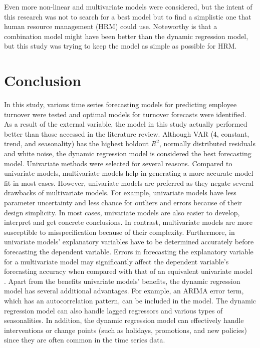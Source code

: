 Even more non-linear and multivariate models were considered, but the intent of this research was not to search for a best model but to find a simplistic one  that human resource management (HRM) could use. Noteworthy is that a combination model might have been better than the dynamic regression model, but this study was trying to keep the model  as simple as possible for HRM.
\section{Conclusion}
In this study, various time series forecasting models for predicting employee turnover were tested and optimal models for turnover forecasts were identified. As a result of the external variable, the model in this study actually performed better than those accessed in the literature review. Although VAR (4, constant, trend, and seasonality) has the highest holdout $R^2$, normally distributed residuals and white noise, the dynamic regression model is considered the best forecasting model. Univariate methods were selected for several reasons. Compared to univariate models, multivariate models help in generating a more accurate model fit in most cases. However, univariate models are preferred as they negate several drawbacks of multivariate models. For example, univariate models have less parameter uncertainty and less chance for outliers and errors because of their design simplicity. In most cases, univariate models are also easier to develop, interpret and get concrete conclusions. In contrast, multivariate models are more susceptible to misspecification because of their complexity. Furthermore, in univariate models' explanatory variables have to be determined accurately before forecasting the dependent variable. Errors in forecasting the explanatory variable for a multivariate model may significantly affect the dependent variable's forecasting accuracy when compared with that of an equivalent univariate model \citep{chatfield2000}. Apart from the benefits univariate models' benefits, the dynamic regression model has several additional advantages. For example, an ARIMA error term, which has an autocorrelation pattern, can be included in the model. The dynamic regression model can also handle lagged regressors and various types of seasonalities. In addition, the dynamic regression model can effectively handle interventions or change points (such as holidays, promotions, and new policies) since they are often common in the time series data.  

